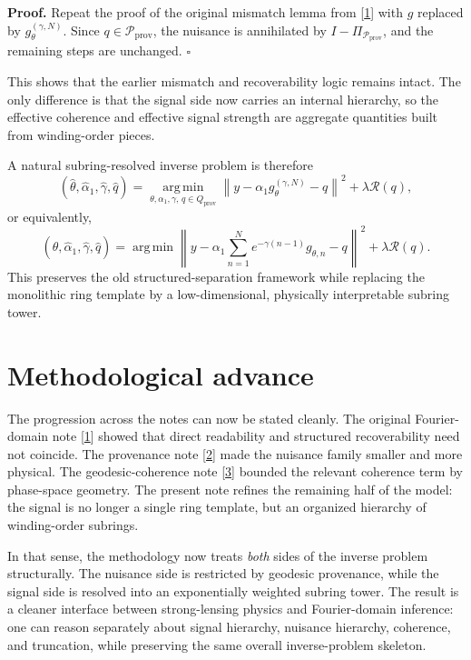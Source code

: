 \documentclass[10pt,letterpaper,twocolumn]{article}
\begin{document}
\par\smallskip\noindent\textbf{Proof.} Repeat the proof of the original mismatch lemma from [\hyperlink{ref-1}{1}] with $g$ replaced by $g_\theta^{(\gamma,N)}$. Since $q\in\mathcal P_{\mathrm{prov}}$, the nuisance is annihilated by $I-\Pi_{\mathcal P_{\mathrm{prov}}}$, and the remaining steps are unchanged.
\hfill$\square$

This shows that the earlier mismatch and recoverability logic remains intact. The only difference is that the signal side now carries an internal hierarchy, so the effective coherence and effective signal strength are aggregate quantities built from winding-order pieces.

A natural subring-resolved inverse problem is therefore
\[
(\hat\theta,\hat\alpha_1,\hat\gamma,\hat q)
=
\operatorname*{arg\,min}_{\theta,\alpha_1,\gamma,\,q\in Q_{\mathrm{prov}}}
\left\|y-\alpha_1 g_\theta^{(\gamma,N)}-q\right\|^2 + \lambda \mathcal R(q),
\]
or equivalently,
\[
(\hat\theta,\hat\alpha_1,\hat\gamma,\hat q)
=
\operatorname*{arg\,min}
\left\|y-\alpha_1\sum_{n=1}^{N} e^{-\gamma(n-1)} g_{\theta,n}-q\right\|^2 + \lambda \mathcal R(q).
\]
This preserves the old structured-separation framework while replacing the monolithic ring template by a low-dimensional, physically interpretable subring tower.

\section{Methodological advance}

The progression across the notes can now be stated cleanly. The original Fourier-domain note [\hyperlink{ref-1}{1}] showed that direct readability and structured recoverability need not coincide. The provenance note [\hyperlink{ref-2}{2}] made the nuisance family smaller and more physical. The geodesic-coherence note [\hyperlink{ref-3}{3}] bounded the relevant coherence term by phase-space geometry. The present note refines the remaining half of the model: the signal is no longer a single ring template, but an organized hierarchy of winding-order subrings.

In that sense, the methodology now treats \emph{both} sides of the inverse problem structurally. The nuisance side is restricted by geodesic provenance, while the signal side is resolved into an exponentially weighted subring tower. The result is a cleaner interface between strong-lensing physics and Fourier-domain inference: one can reason separately about signal hierarchy, nuisance hierarchy, coherence, and truncation, while preserving the same overall inverse-problem skeleton.
\end{document}
